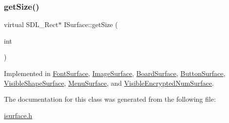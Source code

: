 \mbox{\label{class_i_surface_ae0b5040cd0eaa1897f61f994f7b2eacf}} 
\subsubsection{\texorpdfstring{get\+Size()}{getSize()}}
{\footnotesize\ttfamily virtual S\+D\+L\+\_\+\+Rect$\ast$ I\+Surface\+::get\+Size (\begin{DoxyParamCaption}\item[{int}]{ }\end{DoxyParamCaption})\hspace{0.3cm}{\ttfamily [pure virtual]}}



Implemented in \mbox{\hyperlink{class_font_surface_a42f135c62ef42a0dfddbdf6d8351ef61}{Font\+Surface}}, \mbox{\hyperlink{class_image_surface_ac0367fc1d7f0936f5dc6e56118356fff}{Image\+Surface}}, \mbox{\hyperlink{class_board_surface_a920508ee01c7ad51b33f4411b0acfba1}{Board\+Surface}}, \mbox{\hyperlink{class_button_surface_a6d9fea1db4128f1cafe1237fd217870d}{Button\+Surface}}, \mbox{\hyperlink{class_visible_shape_surface_abc5e37a573511089f2cc42169fb89812}{Visible\+Shape\+Surface}}, \mbox{\hyperlink{class_menu_surface_a80f484cceafba5c53ff4cf2b07db0c3b}{Menu\+Surface}}, and \mbox{\hyperlink{class_visible_encrypted_num_surface_a1630bfa672150174ab134821f50f9ee5}{Visible\+Encrypted\+Num\+Surface}}.



The documentation for this class was generated from the following file\+:\begin{DoxyCompactItemize}
\item 
\mbox{\hyperlink{isurface_8h}{isurface.\+h}}\end{DoxyCompactItemize}
